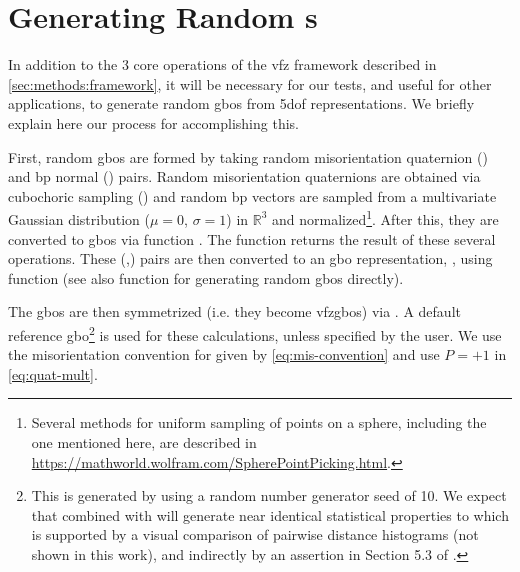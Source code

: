 \documentclass[preprint,12pt]{elsarticle}
\begin{document}

\section{Generating Random s} %
\label{sec:methods:rand}
In addition to the 3 core operations of the \gls{vfz} framework described in \cref{sec:methods:framework}, it will be necessary for our tests, and useful for other applications, to generate random \glspl{gbo} from \gls{5dof} representations. We briefly explain here our process for accomplishing this. 

First, random \glspl{gbo} are formed by taking random misorientation quaternion () and \gls{bp} normal () pairs. Random misorientation quaternions are obtained via cubochoric sampling \cite{singhOrientationSamplingDictionarybased2016} () and random \gls{bp} vectors are sampled from a multivariate Gaussian distribution ($\mu=0$, $\sigma=1$) in $\mathbb{R}^3$ and normalized\footnote{Several methods for uniform sampling of points on a sphere, including the one mentioned here, are described in \url{https://mathworld.wolfram.com/SpherePointPicking.html}.}. After this, they are converted to \glspl{gbo} via \vfzorepo{} function . The \vfzorepo{} function  returns the result of these several operations. These (,) pairs are then converted to an \gls{gbo} representation, , using \vfzorepo{} function  (see also \vfzorepo{} function  for generating random \glspl{gbo} directly).

The \glspl{gbo} are then symmetrized (i.e. they become \glspl{vfzgbo}) via . A default reference \gls{gbo}\footnote{This is generated by  using a random number generator seed of 10. We expect that  combined with  will generate near identical statistical properties to  which is supported by a visual comparison of pairwise distance histograms (not shown in this work), and indirectly by an assertion in Section 5.3 of \citet{morawiecDistancesGrainInterfaces2019}. } is used for these calculations, unless specified by the user. We use the misorientation convention for  given by \cref{eq:mis-convention} and use $P=+1$ in \cref{eq:quat-mult}.
\end{document}
